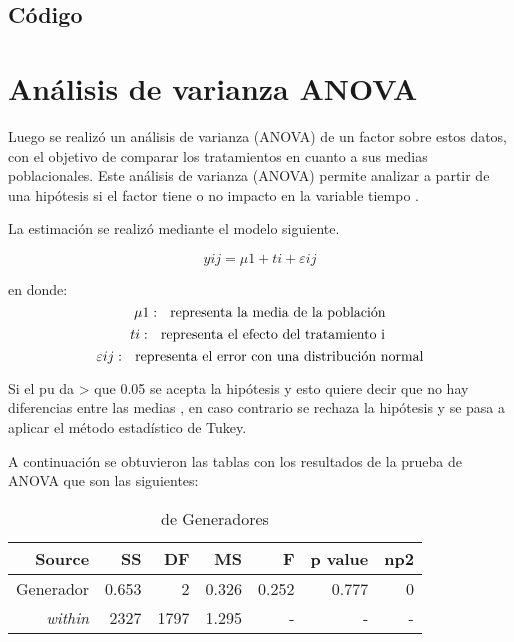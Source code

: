 \documentclass{article}
\begin{document}
\subsection{Código}



\section{Análisis de varianza ANOVA}  
Luego se realizó un análisis de varianza (ANOVA) de un factor sobre estos datos, con el objetivo de comparar los tratamientos en cuanto a sus medias poblacionales. Este análisis de varianza (ANOVA) permite analizar a partir de una hipótesis si el factor tiene o no impacto en la variable tiempo \cite{fallas}.

La estimación se realizó mediante el modelo siguiente.

\begin{equation}
 y{i}{j} = \mu{1} + t{i} + \varepsilon{i}{j}  
\end{equation}

en donde:
\begin{equation}
 \mu{1}: \ \ \textup{representa la media de la población}
\end{equation}  
\begin{equation}
 t{i}: \ \ \textup{representa el efecto del tratamiento i }
\end{equation}   
\begin{equation}
 \varepsilon{i}{j}: \ \ \textup{representa el error con una distribución normal}
\end{equation} 

Si el pu da > que 0.05 se acepta la hipótesis  y esto quiere decir que no hay diferencias entre las medias , en caso contrario se rechaza la hipótesis y se pasa a aplicar el método  estadístico de Tukey.  

A continuación se obtuvieron las tablas con los resultados de la prueba de ANOVA que son las siguientes:

\begin{table}[H]
\caption{{\small de Generadores}}
\begin{center}		
	\centering
		\begin{tabular}{|r|r|r|r|r|r|r|}		
			\hline
			\textbf{Source} & \textbf{SS} & \textbf{DF} & \textbf{MS}& \textbf{F}& \textbf{p value} & \textbf{np2}\\
			
			\hline
			 Generador & 0.653 & 2 &0.326 & 0.252 &0.777 & 0 \\
			 \textit{within}    & 2327& 1797 & 1.295 & - & - & - \\			 			 
			\hline
		\end{tabular}
		\label{cual}
	\label{tab:una-tablita}
\end{center}	
\end{table}
\end{document}
